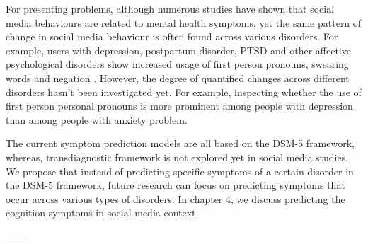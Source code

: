 For presenting problems, although numerous studies have shown that social media behaviours are related to mental health symptoms, yet the same pattern of change in social media behaviour is often found across various disorders. For example, users with depression, postpartum disorder, PTSD and other affective psychological disorders show increased usage of first person pronouns, swearing words and negation \cite{de_choudhury_major_2013,birnbaum_o9.2._2018}. However, the degree of quantified changes across different disorders hasn't been investigated yet. For example, inspecting whether the use of first person personal pronouns is more prominent among people with depression than among people with anxiety problem.  

The current symptom prediction models are all based on the DSM-5 framework, whereas, transdiagnostic framework is not explored yet in social media studies. We propose that instead of predicting specific symptoms of a certain disorder in the DSM-5 framework, future research can focus on predicting symptoms that occur across various types of disorders. In chapter 4, we discuss predicting the cognition symptoms in social media context.


-------




